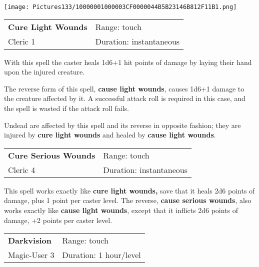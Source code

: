 \documentclass[a4paper,twoside,openany,10pt]{book}
\begin{document}
\begin{multicols}{2}
\begin{flushleft}
	\texttt{[image: Pictures133/10000001000003CF0000044B5B23146B812F11B1.png]}
\end{flushleft}

\smallskip\begin{flushleft} 
	\begin{tabularx}{0.45\textwidth}{@{}m{3.5cm}m{5.5cm}@{}} 
		\textbf{Cure Light Wounds } & Range: touch\\
		Cleric 1 &Duration: instantaneous\\
	\end{tabularx}\end{flushleft}

With this spell the caster heals 1d6+1 hit points of damage by laying
their hand upon the injured creature.

The reverse form of this spell, \textbf{cause light wounds}, causes 1d6+1 damage to the creature affected by it. A successful attack roll is required in this case, and the spell is wasted if the attack roll fails.

Undead are affected by this spell and its reverse in opposite fashion; they are injured by \textbf{cure light wounds} and healed by \textbf{cause light wounds}.

\smallskip\begin{flushleft} 
	\begin{tabularx}{0.45\textwidth}{@{}m{3.5cm}m{5.5cm}@{}} 
		\textbf{Cure Serious Wounds} & Range: touch\\
		Cleric 4 &Duration: instantaneous\\
	\end{tabularx}\end{flushleft}

This spell works exactly like \textbf{cure light wounds,} save that it heals 2d6 points of damage, plus 1 point per caster level. The reverse, \textbf{cause serious wounds}, also works exactly like \textbf{cause light wounds}, except that it inflicts 2d6 points of damage, +2 points per caster level.\medskip


\smallskip\begin{flushleft} 
	\begin{tabularx}{0.45\textwidth}{@{}m{3.5cm}m{5.5cm}@{}} 
		\textbf{Darkvision} & Range: touch\\
Magic-User 3 &Duration: 1 hour/level\\
	\end{tabularx}\end{flushleft}


\end{multicols}
\end{document}
